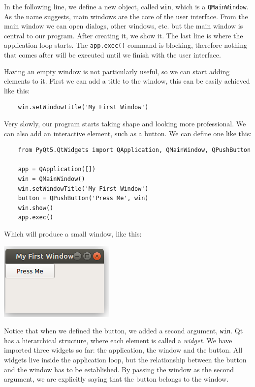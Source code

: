 In the following line, we define a new object, called \texttt{win}, which is a \texttt{QMainWindow}. As the name suggests, main windows are the core of the user interface. From the main window we can open dialogs, other windows, etc. but the main window is central to our program. After creating it, we show it. The last line is where the application loop starts. The \texttt{app.exec()} command is blocking, therefore nothing that comes after will be executed until we finish with the user interface.


Having an empty window is not particularly useful, so we can start adding elements to it. First we can add a title to the window, this can be easily achieved like this:

\begin{verbatim}
    win.setWindowTitle('My First Window')
\end{verbatim}

Very slowly, our program starts taking shape and looking more professional. We can also add an interactive element, such as a button. We can define one like this:

\begin{verbatim}
    from PyQt5.QtWidgets import QApplication, QMainWindow, QPushButton

    app = QApplication([])
    win = QMainWindow()
    win.setWindowTitle('My First Window')
    button = QPushButton('Press Me', win)
    win.show()
    app.exec()
\end{verbatim}

Which will produce a small window, like this:

\begin{center}
    \includegraphics[width=.3\textwidth]{images/Chapter_08/02_simple_window_and_button.png}
\end{center}

Notice that when we defined the button, we added a second argument, \texttt{win}. Qt has a hierarchical structure, where each element is called a \emph{widget}. We have imported three widgets so far: the application, the window and the button. All widgets live inside the application loop, but the relationship between the button and the window has to be established. By passing the window as the second argument, we are explicitly saying that the button belongs to the window.

